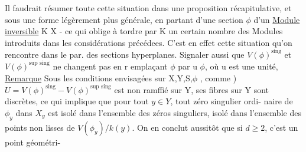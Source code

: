  Il faudrait résumer  toute cette situation dans une proposition
récapitulative, et sous une forme légèrement plus générale, en partant
d'une section $\phi$ d'un \uline{Module inversible}  K  X - ce qui oblige
à tordre par K un certain nombre des Modules introduits dans les
considérations précédees. C'est en effet  cette situation qu'on
rencontre  dans le par. des sections hyperplanes. Signaler aussi que
 $V(\phi)^{\text{sing}}$  et $V(\phi)^{\text{sup sing}}$ ne changent pas en r emplaçant $\phi$ par u $\phi$,
où u est une unité, 
\uline{Remarque} Sous les conditions envisagées sur X,Y,S,$\phi$ , comme )
$U = V(\phi)^{\text{sing}}- V(\phi)^{\text{sup sing}}$ est non ramffié sur Y, ses fibres sur Y sont
discrètes, ce qui implique que pour tout $y\in Y$, tout zéro singulier ordi-%
naire de $\phi_y$ dans $X_y$ est isolé dans l'ensemble des zéros singuliers, 
 isolé dans l'ensemble des points non lisses de $V(\phi_y)/k(y)$.
 On en conclut  aussitôt que si $d\geqslant 2$, c'est un point géométri-%


